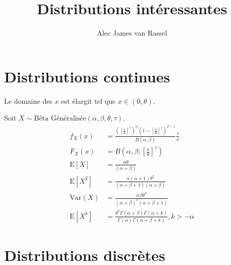 \documentclass[12pt, titlepage,french]{article}
\begin{document}
\title{Distributions intéressantes}
\vspace{-8ex}
\date{}
\author{Alec James van Rassel}
\maketitle

\tableofcontents
\clearpage

\section{Distributions continues}


\begin{distributions}
Le domaine des $x$ est élargit tel que $x \in (0, \theta)$.

Soit $X \sim \text{Bêta Généralisée}(\alpha, \beta, \theta, \tau)$.
	\begin{align*}
	f_{X}(x)
	&=	\frac{\left(\left[\frac{x}{\theta}\right]^{\tau}\right)^{\alpha} \left(1 - \left[\frac{x}{\theta}\right]^{\tau}\right)^{\beta - 1}}{B(\alpha, \beta)}\frac{\tau}{x}	\\
	F_{X}(x)
	&=	B\left(\alpha, \beta; \left[\frac{x}{\theta}\right]^{\tau}\right)	\\
	\text{E}[X]
	&=	\frac{\alpha \theta}{(\alpha + \beta)}	\\
	\text{E}[X^{2}]
	&=	\frac{\alpha (\alpha + 1) \theta^{2}}{(\alpha + \beta + 1)(\alpha + \beta )}	\\
	\text{Var}(X)
	&=	\frac{\alpha \beta \theta^{2}}{(\alpha + \beta )^{2}(\alpha + \beta + 1)}	\\
	\text{E}[X^{k}]
	&=	\frac{\theta^{k} \Gamma(\alpha + \beta) \Gamma(\alpha + k)}{\Gamma(\alpha) \Gamma(\alpha + \beta + k)}, k > -\alpha
	\end{align*}
\end{distributions}

\clearpage
\section{Distributions discrètes}
\end{document}
